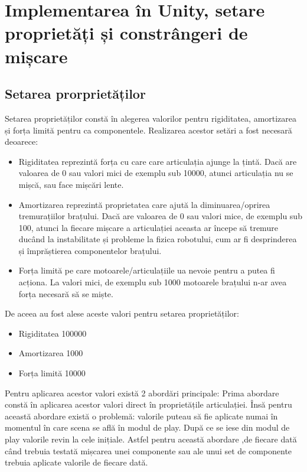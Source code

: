 \clearpage

\section {Implementarea în Unity, setare proprietăți și constrângeri de mișcare}
\subsection{Setarea prorprietăților}

Setarea proprietăților constă în alegerea valorilor pentru rigiditatea, amortizarea și forța limită pentru ca componentele. Realizarea acestor setări a fost necesară deoarece:

\begin{itemize}
	\item Rigiditatea reprezintă forța cu care care articulația ajunge la țintă. Dacă are valoarea de 0 sau valori mici de exemplu sub 10000, atunci articulația nu se mișcă, sau face mișcări lente.
	\item Amortizarea reprezintă proprietatea care ajută la diminuarea/oprirea tremurațiilor brațului. Dacă are valoarea de 0 sau valori mice, de exemplu sub 100, atunci la fiecare mișcare a articulației aceasta ar începe să tremure ducând la instabilitate și probleme la fizica robotului, cum ar fi desprinderea și împrăștierea componentelor brațului.
	\item Forța limită pe care motoarele/articulațiile ua nevoie pentru a putea fi acționa. La valori mici, de exemplu sub 1000 motoarele brațului n-ar avea forța necesară să se miște.
	\end{itemize}

De aceea au fost alese aceste valori pentru setarea proprietăților:
\begin{itemize}
	\item Rigiditatea 100000
	\item Amortizarea 1000
	\item Forța limită 10000
\end{itemize}

Pentru aplicarea acestor valori există 2 abordări principale:
Prima abordare constă în aplicarea  acestor valori direct în proprietățile articulației. Însă pentru această abordare există o problemă: valorile puteau să fie aplicate numai în momentul în care scena se află 
în modul de play. După ce se iese din modul de play valorile revin la cele inițiale. Astfel pentru această abordare ,de fiecare dată când trebuia testată mișcarea unei componente sau ale unui set de componente trebuia aplicate valorile de fiecare dată.

